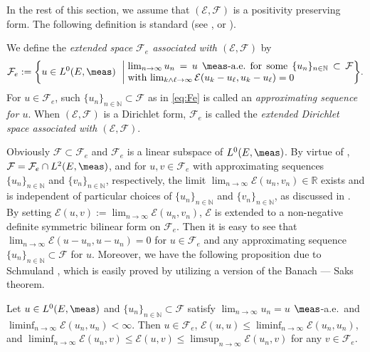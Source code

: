 In the rest of this section, we assume that $(\mathcal{E},\mathcal{F})$ is a
positivity preserving form. The following definition is standard
(see \cite[Definition 3]{Sch:extend}, \cite[Definition 1.1.4]{CF} or \cite[Definition 1.4]{F:Fe}).
%
\begin{dfn}\label{dfn:Fe}
We define the \emph{extended space $\mathcal{F}_{e}$ associated with
$(\mathcal{E},\mathcal{F})$} by
\begin{equation}\label{eq:Fe}
\mathcal{F}_{e}:=\biggl\{u\in L^{0}(E,\meas)\ \biggm|
  \begin{minipage}{230pt}
    $\lim_{n\to\infty}u_{n}=u$ $\meas$-a.e.\ for some
    $\{u_{n}\}_{n\in\mathbb{N}}\subset\mathcal{F}$ with
    $\lim_{k\wedge\ell\to\infty}\mathcal{E}(u_{k}-u_{\ell},u_{k}-u_{\ell})=0$
  \end{minipage}\biggr\}.
\end{equation}
For $u\in\mathcal{F}_{e}$, such
$\{u_{n}\}_{n\in\mathbb{N}}\subset\mathcal{F}$ as in \eqref{eq:Fe} is
called an \emph{approximating sequence for $u$}.
When $(\mathcal{E},\mathcal{F})$ is a Dirichlet form, $\mathcal{F}_{e}$ is called
the \emph{extended Dirichlet space associated with $(\mathcal{E},\mathcal{F})$}.
\end{dfn}
%
Obviously $\mathcal{F}\subset\mathcal{F}_{e}$ and $\mathcal{F}_{e}$ is a linear
subspace of $L^{0}(E,\meas)$. By virtue of \cite[Proposition 2]{Sch:Fatou},
$\mathcal{F}=\mathcal{F}_{e}\cap L^{2}(E,\meas)$, and
for $u,v\in\mathcal{F}_{e}$ with approximating sequences
$\{u_{n}\}_{n\in\mathbb{N}}$ and $\{v_{n}\}_{n\in\mathbb{N}}$, respectively,
the limit $\lim_{n\to\infty}\mathcal{E}(u_{n},v_{n})\in\mathbb{R}$
exists and is independent of particular choices of
$\{u_{n}\}_{n\in\mathbb{N}}$ and $\{v_{n}\}_{n\in\mathbb{N}}$,
as discussed in \cite[before Definition 3]{Sch:extend}.
By setting $\mathcal{E}(u,v):=\lim_{n\to\infty}\mathcal{E}(u_{n},v_{n})$,
$\mathcal{E}$ is extended to a non-negative definite symmetric bilinear form on
$\mathcal{F}_{e}$. Then it is easy to see that
$\lim_{n\to\infty}\mathcal{E}(u-u_{n},u-u_{n})=0$ for
$u\in\mathcal{F}_{e}$ and any approximating sequence
$\{u_{n}\}_{n\in\mathbb{N}}\subset\mathcal{F}$ for $u$.
Moreover, we have the following proposition due to Schmuland \cite{Sch:extend}, which is
easily proved by utilizing a version \cite[Theorem A.4.1-(ii)]{CF} of the Banach --- Saks theorem.
%
\begin{prop}\label{prop:Fe-Fatou}
Let $u\in L^{0}(E,\meas)$ and $\{u_{n}\}_{n\in\mathbb{N}}\subset\mathcal{F}$
satisfy $\lim_{n\to\infty}u_{n}=u$ $\meas$-a.e.\ and
$\liminf_{n\to\infty}\mathcal{E}(u_{n},u_{n})<\infty$.
Then $u\in\mathcal{F}_{e}$,
$\mathcal{E}(u,u)\leq\liminf_{n\to\infty}\mathcal{E}(u_{n},u_{n})$, and
$\liminf_{n\to\infty}\mathcal{E}(u_{n},v)\leq\mathcal{E}(u,v)
	\leq\limsup_{n\to\infty}\mathcal{E}(u_{n},v)$
for any $v\in\mathcal{F}_{e}$.
\end{prop}
